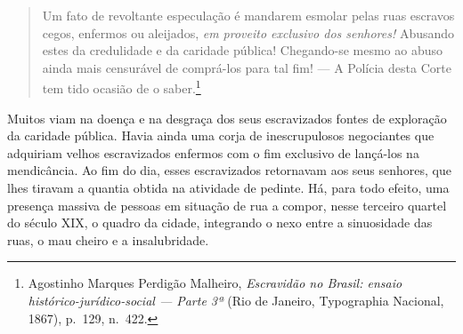 \begin{quote}
Um fato de revoltante especulação é mandarem esmolar pelas ruas escravos
cegos, enfermos ou aleijados, \textit{em proveito exclusivo dos senhores!}
Abusando estes da credulidade e da caridade pública! Chegando-se mesmo
ao abuso ainda mais censurável de comprá-los para tal fim! --- A Polícia
desta Corte tem tido ocasião de o saber.\footnote{Agostinho Marques
  Perdigão Malheiro, \textit{Escravidão no Brasil: ensaio
  histórico-jurídico-social --- Parte 3ª} (Rio de Janeiro, Typographia
  Nacional, 1867), p.~129, n.~422.}
\end{quote}

Muitos viam na doença e na desgraça dos seus escravizados fontes de
exploração da caridade pública. Havia ainda uma corja de inescrupulosos
negociantes que adquiriam velhos escravizados enfermos com o fim
exclusivo de lançá-los na mendicância. Ao fim do dia, esses escravizados
retornavam aos seus senhores, que lhes tiravam a quantia obtida na
atividade de pedinte. Há, para todo efeito, uma presença massiva de
pessoas em situação de rua a compor, nesse terceiro quartel do século
XIX, o quadro da cidade, integrando o nexo entre a sinuosidade das ruas,
o mau cheiro e a insalubridade.

